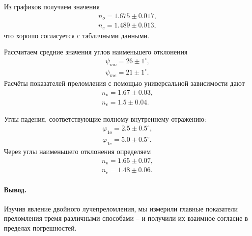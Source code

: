 \documentclass{../lab_class}
\begin{document}
Из графиков получаем значения
\begin{gather*}
	n_o = 1.675 \pm 0.017, \\
	n_e = 1.489 \pm 0.013,
\end{gather*}
что хорошо согласуется с табличными данными. 

Рассчитаем средние значения углов наименьшего отклонения
\begin{gather*}
	\psi_{mo} = 26 \pm 1^{\circ}, \\
	\psi_{me} = 21 \pm 1^{\circ}.
\end{gather*}
Расчёты показателей преломления с помощью универсальной зависимости дают
\begin{gather*}
	n_o = 1.67 \pm 0.03, \\
	n_e = 1.5 \pm 0.04.
\end{gather*}

Углы падения, соответствующие полному внутреннему отражению:
\begin{gather*}
	\varphi_{1o} = 2.5 \pm {0.5}^{\circ}, \\
	\varphi_{1e} = 5.0 \pm {0.5}^{\circ}.
\end{gather*}
Через углы наименьшего отклонения определяем
\begin{gather*}
	n_o = 1.65 \pm 0.07, \\
	n_e = 1.48 \pm 0.06.
\end{gather*}

\paragraph{Вывод.}
Изучив явление двойного лучепреломления, мы измерили главные показатели преломления тремя различными способами -- и получили их взаимное согласие в пределах погрешностей.
\end{document}
